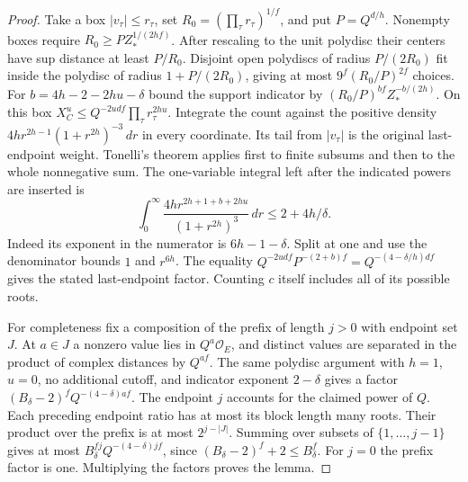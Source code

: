 \documentclass[a4paper,11pt]{article}
\theoremstyle{definition}
\theoremstyle{remark}
\numberwithin{equation}{section}
\begin{document}
\begin{proof}
Take a box \(|v_\tau|\le r_\tau\), set
\(R_0=(\prod_\tau r_\tau)^{1/f}\), and put \(P=Q^{d/h}\).
Nonempty boxes require \(R_0\ge P Z_*^{1/(2hf)}\). After rescaling
to the unit polydisc their centers have sup distance at least
\(P/R_0\). Disjoint open polydiscs of radius \(P/(2R_0)\) fit
inside the polydisc of radius \(1+P/(2R_0)\), giving at most
\(9^f(R_0/P)^{2f}\) choices. For \(b=4h-2-2hu-\delta\) bound
the support indicator by \((R_0/P)^{bf} Z_*^{-b/(2h)}\).
On this box \(X_C^u\le Q^{-2udf}\prod_\tau r_\tau^{2hu}\).
Integrate the count against the positive density
\(4h r^{2h-1}(1+r^{2h})^{-3}\,dr\) in every coordinate. Its
tail from \(|v_\tau|\) is the original last-endpoint weight.
Tonelli's theorem applies first to finite subsums and then to
the whole nonnegative sum. The one-variable integral left after
the indicated powers are inserted is
\[
   \int_0^\infty \frac{4h r^{2h+1+b+2hu}}{(1+r^{2h})^3}\,dr
          \le 2+4h/\delta .
\]
Indeed its exponent in the numerator is \(6h-1-\delta\). Split
at one and use the denominator bounds \(1\) and \(r^{6h}\).
The equality \(Q^{-2udf}P^{-(2+b)f}
=Q^{-(4-\delta/h)df}\) gives the stated last-endpoint factor.
Counting \(c\) itself includes all of its possible roots.

For completeness fix a composition of the prefix of length \(j>0\)
with endpoint set \(J\). At \(a\in J\) a nonzero value lies in
\(Q^a\mathcal O_E\), and distinct values are separated in the
product of complex distances by \(Q^{af}\). The same polydisc
argument with \(h=1\), \(u=0\), no additional cutoff, and
indicator exponent \(2-\delta\) gives a factor
\((B_\delta-2)^f Q^{-(4-\delta)af}\).
The endpoint \(j\) accounts for the claimed power of \(Q\).
Each preceding endpoint ratio has at most its block length many
roots. Their product over the prefix is at most \(2^{j-|J|}\).
Summing over subsets of \(\{1,\ldots,j-1\}\) gives at most
\(B_\delta^{fj} Q^{-(4-\delta)jf}\), since
\((B_\delta-2)^f+2\le B_\delta^f\). For \(j=0\) the prefix
factor is one. Multiplying the factors proves the lemma.
\end{proof}
\end{document}
